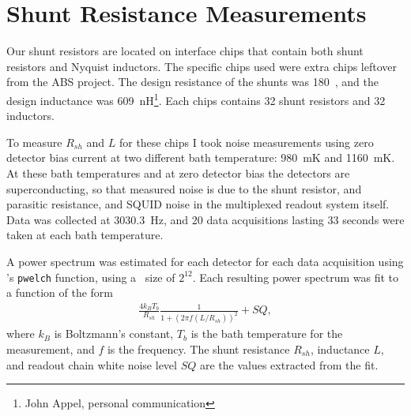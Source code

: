 


\section{Shunt Resistance Measurements}

Our shunt resistors are located on interface chips that contain both shunt resistors and Nyquist inductors.
The specific chips used were extra chips leftover from the ABS\cite{kusaka_modulation_2013} project.
The design resistance of the shunts was 180~\uOhm, and the design inductance was 609~nH\footnote{John Appel, personal communication}.
Each chips contains 32 shunt resistors and 32 inductors.

To measure $R_{sh}$ and $L$ for these chips I took noise measurements using zero detector bias current at two different bath temperature: 980~mK and 1160~mK.
At these bath temperatures and at zero detector bias the detectors are superconducting, so that measured noise is due to the shunt resistor, and parasitic resistance, and SQUID noise in the multiplexed readout system itself.
Data was collected at 3030.3~Hz, and 20 data acquisitions lasting 33 seconds were taken at each bath temperature.

A power spectrum was estimated for each detector for each data acquisition using \MATLAB's \texttt{pwelch} function, using a \FFT\ size of $2^{12}$.
Each resulting power spectrum was fit to a function of the form
\begin{eqnarray}\label{eqn:scnoise-fit}
	\frac{4 k_B T_b}{R_{sh}} \frac{1}{1 + (2 \pi f (L/R_{sh}))^2} + SQ,
\end{eqnarray}
where $k_B$ is Boltzmann's constant, $T_b$ is the bath temperature for the measurement, and $f$ is the frequency.
The shunt resistance $R_{sh}$, inductance $L$, and readout chain white noise level $SQ$ are the values extracted from the fit.

